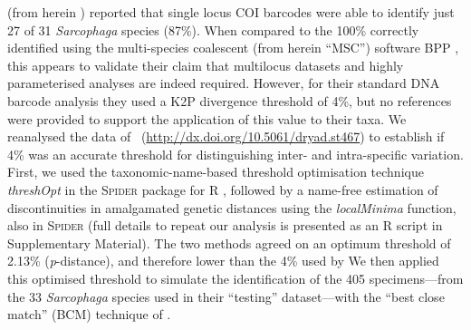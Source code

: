 \documentclass[12pt]{article}
\begin{document}
\citet{Dowton2014} (from herein \citeauthor{Dowton2014}) reported that single locus COI barcodes were able to identify just 27 of 31 \emph{Sarcophaga} species (87\%). When compared to the 100\% correctly identified using the multi-species coalescent (from herein ``MSC'') software BPP \citep{Yang2010}, this appears to validate their claim that multilocus datasets and highly parameterised analyses are indeed required. However, for their standard DNA barcode analysis they used a K2P divergence threshold of 4\%, but no references were provided to support the application of this value to their taxa. We reanalysed the data of \citeauthor{Dowton2014}\ (\url{http://dx.doi.org/10.5061/dryad.st467}) to establish if 4\% was an accurate threshold for distinguishing inter- and intra-specific variation. First, we used the taxonomic-name-based threshold optimisation technique \textsl{threshOpt} in the \textsc{Spider} package for R \citep{Brown2012}, followed by a name-free estimation of discontinuities in amalgamated genetic distances using the \textsl{localMinima} function, also in \textsc{Spider} (full details to repeat our analysis is presented as an R script in Supplementary Material). The two methods agreed on an optimum threshold of 2.13\% (\emph{p}-distance), and therefore lower than the 4\% used by \citeauthor{Dowton2014} We then applied this optimised threshold to simulate the identification of the 405 specimens---from the 33 \emph{Sarcophaga} species used in their ``testing'' dataset---with the ``best close match'' (BCM) technique of \citet{Meier2006}.
\end{document}
